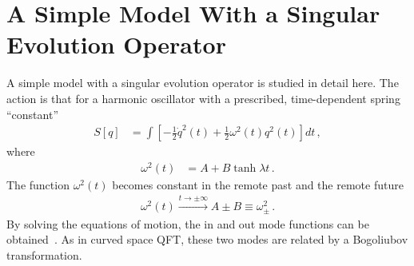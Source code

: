 \documentclass[12pt,a4paper]{article}
\begin{document}
\appendix

\section{ A Simple Model With a Singular Evolution Operator}
\label{sec:singular}

A simple model with a singular evolution operator is studied in detail here. The action is that for a
harmonic oscillator with a prescribed, time-dependent spring
``constant''~\cite{l}
\begin{equation}
\label{eq:82}
\begin{split}
S[q] &=
\int[-\frac{1}{2}\dot{q}^2(t)+\frac{1}{2}\omega^2(t)q^2(t)]dt \,,
\end{split}
\end{equation}
where
\begin{equation}
\label{eq:83}
\begin{split}
\omega^2(t) &= A+B\tanh\lambda t \,.
\end{split}
\end{equation}
The function $\omega^2(t)$ becomes constant in the remote past and
the remote future
\begin{equation}
\label{eq:84}
\begin{split}
\omega^2(t)\stackrel{t\rightarrow\pm \infty}{\longrightarrow}A\pm
B\equiv \omega_{\pm }^2 \,.
\end{split}
\end{equation}
By solving the equations of motion, the in and out
mode functions can be obtained~\cite{l}. As in curved space QFT,
these two modes are related by a Bogoliubov transformation.
\end{document}
